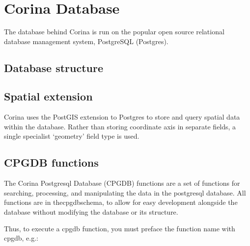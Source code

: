 \chapter{Corina Database}

The database behind Corina is run on the popular open source relational database management system, PostgreSQL (Postgres). 


\section{Database structure}


\section{Spatial extension}

Corina uses the PostGIS extension to Postgres to store and query spatial data within the database.  Rather than storing coordinate axis in separate fields, a single specialist `geometry' field type is used.


\section{CPGDB functions}
\label{txt:cpgdbfunctions}
The Corina Postgresql Database (CPGDB) functions are a set of functions for searching, processing, and manipulating the data in the postgresql database. All functions are in thecpgdbschema, to allow for easy development alongside the database without modifying the database or its structure.

Thus, to execute a cpgdb function, you must preface the function name with cpgdb, e.g.: 




